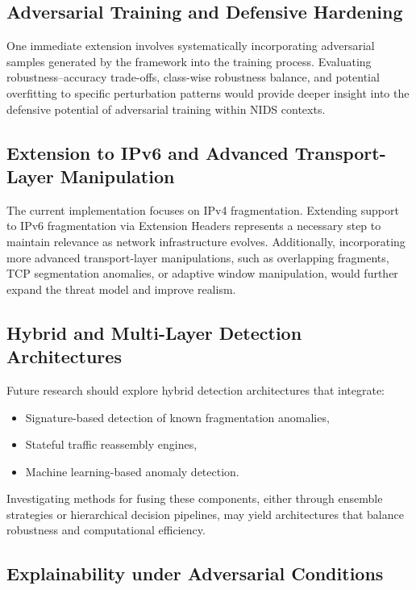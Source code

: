 \subsection{Adversarial Training and Defensive Hardening}

One immediate extension involves systematically incorporating adversarial samples generated by the framework into the training process. Evaluating robustness–accuracy trade-offs, class-wise robustness balance, and potential overfitting to specific perturbation patterns would provide deeper insight into the defensive potential of adversarial training within NIDS contexts.

\subsection{Extension to IPv6 and Advanced Transport-Layer Manipulation}

The current implementation focuses on IPv4 fragmentation. Extending support to IPv6 fragmentation via Extension Headers represents a necessary step to maintain relevance as network infrastructure evolves. Additionally, incorporating more advanced transport-layer manipulations, such as overlapping fragments, TCP segmentation anomalies, or adaptive window manipulation, would further expand the threat model and improve realism.

\subsection{Hybrid and Multi-Layer Detection Architectures}

Future research should explore hybrid detection architectures that integrate:

\begin{itemize}
\item Signature-based detection of known fragmentation anomalies,
\item Stateful traffic reassembly engines,
\item Machine learning-based anomaly detection.
\end{itemize}

Investigating methods for fusing these components, either through ensemble strategies or hierarchical decision pipelines, may yield architectures that balance robustness and computational efficiency.

\subsection{Explainability under Adversarial Conditions}

